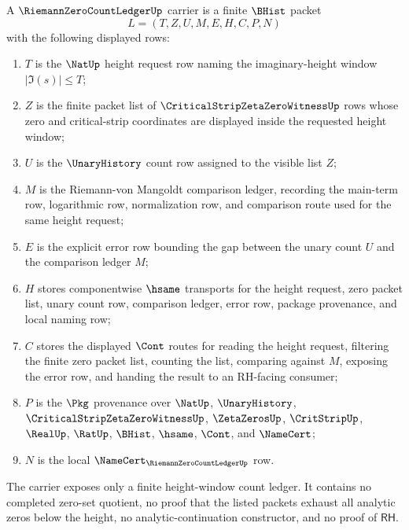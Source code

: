 \begin{definition}
\label{def:riemann-zero-count-ledger-carrier}
A $\RiemannZeroCountLedgerUp$ carrier is a finite $\BHist$ packet
$$
L=(T,Z,U,M,E,H,C,P,N)
$$
with the following displayed rows:
\begin{enumerate}
\item $T$ is the $\NatUp$ height request row naming the imaginary-height window $|\Im(s)| \le T$;
\item $Z$ is the finite packet list of $\CriticalStripZetaZeroWitnessUp$ rows whose zero and critical-strip coordinates are displayed inside the requested height window;
\item $U$ is the $\UnaryHistory$ count row assigned to the visible list $Z$;
\item $M$ is the Riemann-von Mangoldt comparison ledger, recording the main-term row, logarithmic row, normalization row, and comparison route used for the same height request;
\item $E$ is the explicit error row bounding the gap between the unary count $U$ and the comparison ledger $M$;
\item $H$ stores componentwise $\hsame$ transports for the height request, zero packet list, unary count row, comparison ledger, error row, package provenance, and local naming row;
\item $C$ stores the displayed $\Cont$ routes for reading the height request, filtering the finite zero packet list, counting the list, comparing against $M$, exposing the error row, and handing the result to an RH-facing consumer;
\item $P$ is the $\Pkg$ provenance over $\NatUp$, $\UnaryHistory$, $\CriticalStripZetaZeroWitnessUp$, $\ZetaZerosUp$, $\CritStripUp$, $\RealUp$, $\RatUp$, $\BHist$, $\hsame$, $\Cont$, and $\NameCert$;
\item $N$ is the local $\NameCert_{\RiemannZeroCountLedgerUp}$ row.
\end{enumerate}
The carrier exposes only a finite height-window count ledger. It contains no completed zero-set quotient, no proof that the listed packets exhaust all analytic zeros below the height, no analytic-continuation constructor, and no proof of $\mathsf{RH}$.
\end{definition}

